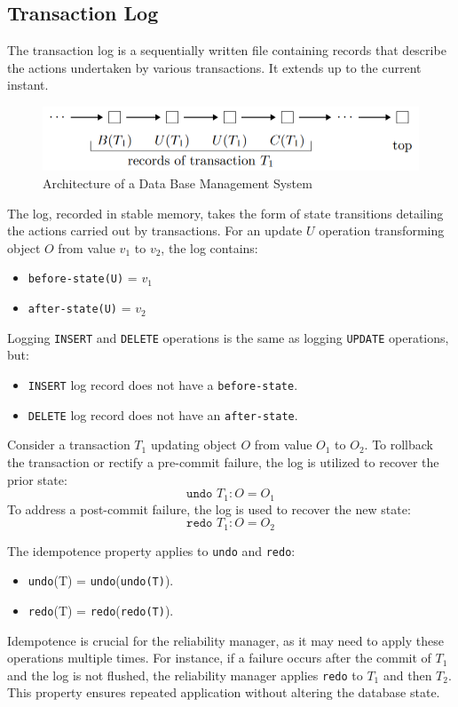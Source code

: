 \subsection{Transaction Log}
The transaction log is a sequentially written file containing records that describe the actions undertaken by various transactions. 
It extends up to the current instant.
\begin{figure}[H]
    \centering
    \includegraphics[width=0.5\linewidth]{images/tl}
    \caption{Architecture of a Data Base Management System}
\end{figure}
The log, recorded in stable memory, takes the form of state transitions detailing the actions carried out by transactions.
For an update $U$ operation transforming object $O$ from value $v_1$ to $v_2$, the log contains:
\begin{itemize}
    \item \texttt{before-state(U)} = $v_1$
    \item \texttt{after-state(U)} = $v_2$
\end{itemize}
Logging \texttt{INSERT} and \texttt{DELETE} operations is the same as logging \texttt{UPDATE} operations, but:
\begin{itemize}
    \item \texttt{INSERT} log record does not have a \texttt{before-state}.
    \item \texttt{DELETE} log record does not have an \texttt{after-state}.
\end{itemize}
\begin{example}
    Consider a transaction $T_1$ updating object $O$ from value $O_1$ to $O_2$.
    To rollback the transaction or rectify a pre-commit failure, the log is utilized to recover the prior state:
    \[\texttt{undo }T_1:O=O_1\]
    To address a post-commit failure, the log is used to recover the new state:
    \[\texttt{redo }T_1:O=O_2\]
\end{example}
The idempotence property applies to \texttt{undo} and \texttt{redo}: 
\begin{itemize}
    \item \texttt{undo}(T) = \texttt{undo}(\texttt{undo(T)}).
    \item \texttt{redo}(T) = \texttt{redo}(\texttt{redo(T)}).
\end{itemize}
Idempotence is crucial for the reliability manager, as it may need to apply these operations multiple times. 
For instance, if a failure occurs after the commit of $T_1$ and the log is not flushed, the reliability manager applies \texttt{redo} to $T_1$ and then $T_2$.
This property ensures repeated application without altering the database state.

